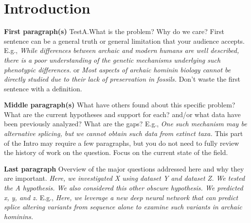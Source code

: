 
\section{Introduction}
\introTips %

\noindent\textbf{First paragraph(s)} TestA.What is the problem? Why do we care?  First sentence can be a general truth or general limitation that your audience accepts. E.g., \textit{While differences between archaic and modern humans are well described, there is a poor understanding of the genetic mechanisms underlying such phenotypic differences.} or  \textit{Most aspects of archaic hominin biology cannot be directly studied due to their lack of preservation in fossils.} Don't waste the first sentence with a definition.

\textbf{Middle paragraph(s)} What have others found about this specific problem? What are the current hypotheses and support for each? and/or what data have been previously analyzed? What are the gaps? E.g., \textit{One such mechanism may be alternative splicing, but we cannot obtain such data from extinct taxa.} This part of the Intro may require a few paragraphs, but you do not need to fully review the history of work on the question. Focus on the current state of the field.

\textbf{Last paragraph} Overview of the major questions addressed here and why they are important. \textit{Here, we investigated X using dataset Y and dataset Z. We tested the A hypothesis. We also considered this other obscure hypothesis. We predicted x, y, and z.} E.g., \textit{Here, we leverage a new deep neural network that can predict splice altering variants from sequence alone to examine such variants in archaic hominins.}

